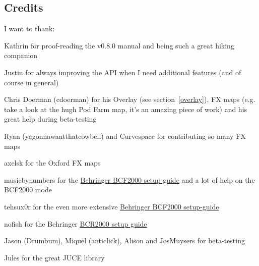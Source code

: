 \subsection{Credits}
I want to thank:
\begin{compactitem}
\item Kathrin for proof-reading the v0.8.0 manual and being such a great
  hiking companion
\item Justin for always improving the \reaper API when I need
  additional features (and of course \reaper in general)
\item Chris Doerman (cdoerman) for his Overlay (see
  section~\ref{overlay}), FX maps (e.g. take a look at the hugh Pod
  Farm map, it's an amazing piece of work) and his great help during
  beta-testing
\item Ryan (yagonnawantthatcowbell) and Curvespace for contributing so
  many FX maps
\item axelsk for the Oxford FX maps
\item musicbynumbers for the
  \href{http://forum.cockos.com/showpost.php?p=473466&postcount=127}{Behringer
    BCF2000 setup-guide} and a lot of help on the BCF2000 mode
\item tehsux0r for the even more extensive
  \href{http://forum.cockos.com/showthread.php?t=117909}{Behringer
    BCF2000 setup-guide}
\item nofish for the Behringer
  \href{http://forum.cockos.com/showthread.php?t=60110}{BCR2000
    setup guide}
\item Jason (Drumbum), Miquel (anticlick), Alison and JosMuysers for
beta-testing
\item Jules for the great JUCE library
\end{compactitem}

